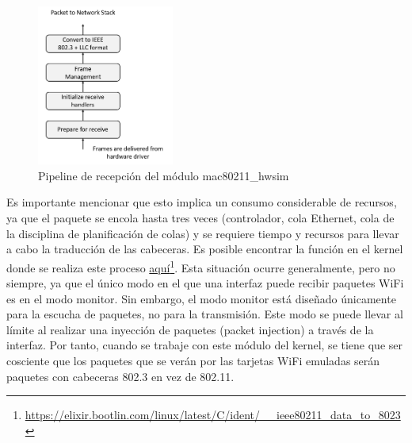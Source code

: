\begin{figure}[ht]
    \centering
    \includegraphics[width=0.4\textwidth]{archivos/img/teoria/linux_wireless_subsystem_rx.png}
    \caption{Pipeline de recepción del módulo mac80211\_hwsim \cite{5415877}}
    \label{fig:analysis_p4_wifi_8}
\end{figure}

Es importante mencionar que esto implica un consumo considerable de recursos, ya que el paquete se encola hasta tres veces (controlador, cola Ethernet, cola de la disciplina de planificación de colas) y se requiere tiempo y recursos para llevar a cabo la traducción de las cabeceras. Es posible encontrar la función en el kernel donde se realiza este proceso \href{https://elixir.bootlin.com/linux/latest/C/ident/__ieee80211_data_to_8023}{aquí}\footnote{\url{https://elixir.bootlin.com/linux/latest/C/ident/__ieee80211_data_to_8023}}. Esta situación ocurre generalmente, pero no siempre, ya que el único modo en el que una interfaz puede recibir paquetes WiFi es en el modo monitor. Sin embargo, el modo monitor está diseñado únicamente para la escucha de paquetes, no para la transmisión. Este modo se puede llevar al límite al realizar una inyección de paquetes (packet injection) a través de la interfaz. Por tanto, cuando se trabaje con este módulo del kernel, se tiene que ser cosciente que los paquetes que se verán por las tarjetas WiFi emuladas serán paquetes con cabeceras 802.3 en vez de 802.11.